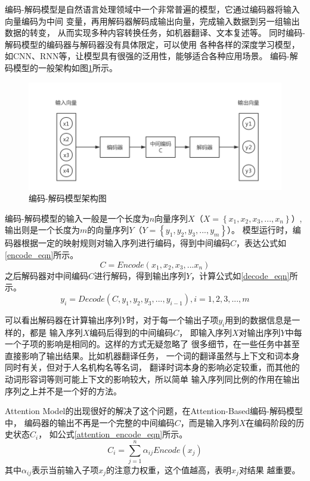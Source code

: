 编码-解码模型是自然语言处理领域中一个非常普遍的模型，它通过编码器将输入向量编码为中间
变量，再用解码器解码成输出向量，完成输入数据到另一组输出数据的转变，
从而实现多种内容转换任务，如机器翻译、文本复述等。
同时编码-解码模型的编码器与解码器没有具体限定，可以使用
各种各样的深度学习模型，如CNN、RNN等，让模型具有很强的泛用性，能够适合各种应用场景。
编码-解码模型的一般架构如图\ref{Encoder}所示。
\begin{figure}[h]
    \includegraphics[scale=0.5]{picture/Encoder.png}
    \caption{编码-解码模型架构图}
    \label{Encoder}
\end{figure}

编码-解码模型的输入一般是一个长度为$n$向量序列$X$（$X= \left \{x_1,x_2,x_3,...,x_n \right \}$）,
输出则是一个长度为$m$的向量序列$Y$（$Y= \left \{y_1,y_2,y_3,...,y_m \right \}$）。
模型运行时，编码器根据一定的映射规则对输入序列进行编码，得到中间编码$C$，表达公式如\ref{encode_eqn}所示。
\begin{equation}
    C=Encode\left ( x_1,x_2,x_3,...x_n \right )
    \label{encode_eqn}
\end{equation}
之后解码器对中间编码$C$进行解码，得到输出序列$Y$，计算公式如\ref{decode_eqn}所示。
\begin{equation}
    y_i=Decode\left ( C,y_1,y_2,y_3,...,y_{i-1} \right ),i=1,2,3,...,m
    \label{decode_eqn}
\end{equation}

可以看出解码器在计算输出序列$Y$时，对于每一个输出子项$y_i$用到的数据信息是一样的，都是
输入序列$X$编码后得到的中间编码$C$，
即输入序列$X$对输出序列$Y$中每一个子项的影响是相同的。这样的方式无疑忽略了
很多细节，在一些任务中甚至直接影响了输出结果。比如机器翻译任务，
一个词的翻译虽然与上下文和词本身同时有关，但对于人名机构名等名词，
翻译时词本身的影响必定较重，而其他的动词形容词等则可能上下文的影响较大，所以简单
输入序列同比例的作用在输出序列之上并不是一个好的方法。

Attention Model的出现很好的解决了这个问题，在Attention-Based编码-解码模型中，
编码器的输出不再是一个完整的中间编码$C$，而是输入序列$X$在编码阶段的历史状态$C_i$，
如公式\ref{attention_encode_eqn}所示。
\begin{equation}
    C_i=\sum_{j=1}^{n}\alpha_{ij}Encode\left ( x_j \right )
    \label{attention_encode_eqn}
\end{equation}
其中$\alpha_{ij}$表示当前输入子项$x_j$的注意力权重，这个值越高，表明$x_j$对结果
越重要。

